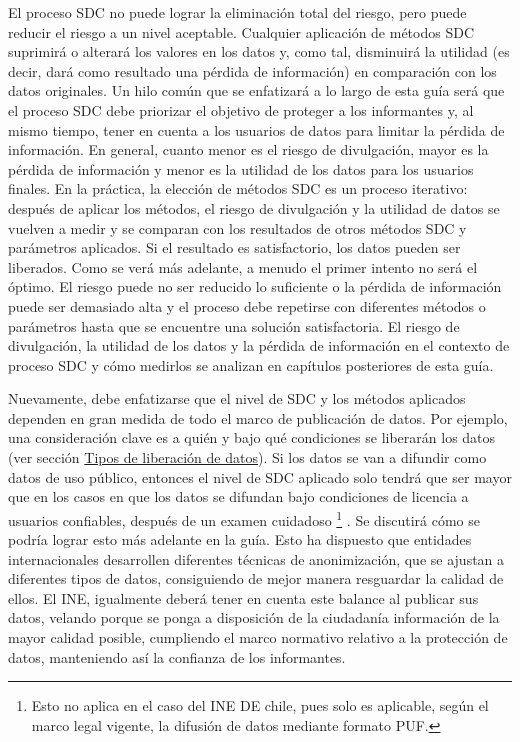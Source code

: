 \documentclass[]{book}
\theoremstyle{definition}
\theoremstyle{definition}
\theoremstyle{definition}
\theoremstyle{definition}
\theoremstyle{remark}
\begin{document}
El proceso SDC no puede lograr la eliminación total del riesgo, pero puede reducir el riesgo a un nivel aceptable. Cualquier aplicación de métodos SDC suprimirá o alterará los valores en los datos y, como tal, disminuirá la utilidad (es decir, dará como resultado una pérdida de información) en comparación con los datos originales. Un hilo común que se enfatizará a lo largo de esta guía será que el proceso SDC debe priorizar el objetivo de proteger a los informantes y, al mismo tiempo, tener en cuenta a los usuarios de datos para limitar la pérdida de información. En general, cuanto menor es el riesgo de divulgación, mayor es la pérdida de información y menor es la utilidad de los datos para los usuarios finales.
En la práctica, la elección de métodos SDC es un proceso iterativo: después de aplicar los métodos, el riesgo de divulgación y la utilidad de datos se vuelven a medir y se comparan con los resultados de otros métodos SDC y parámetros aplicados. Si el resultado es satisfactorio, los datos pueden ser liberados. Como se verá más adelante, a menudo el primer intento no será el óptimo. El riesgo puede no ser reducido lo suficiente o la pérdida de información puede ser demasiado alta y el proceso debe repetirse con diferentes métodos o parámetros hasta que se encuentre una solución satisfactoria. El riesgo de divulgación, la utilidad de los datos y la pérdida de información en el contexto de proceso SDC y cómo medirlos se analizan en capítulos posteriores de esta guía.

Nuevamente, debe enfatizarse que el nivel de SDC y los métodos aplicados dependen en gran medida de todo el marco de publicación de datos. Por ejemplo, una consideración clave es a quién y bajo qué condiciones se liberarán los datos (ver sección \protect\hyperlink{tipos-de-liberaciuxf3n-de-datos}{Tipos de liberación de datos}). Si los datos se van a difundir como datos de uso público, entonces el nivel de SDC aplicado solo tendrá que ser mayor que en los casos en que los datos se difundan bajo condiciones de licencia a usuarios confiables, después de un examen cuidadoso \footnote{Esto no aplica en el caso del INE DE chile, pues solo es aplicable, según el marco legal vigente, la difusión de datos mediante formato PUF.} . Se discutirá cómo se podría lograr esto más adelante en la guía.
Esto ha dispuesto que entidades internacionales desarrollen diferentes técnicas de anonimización, que se ajustan a diferentes tipos de datos, consiguiendo de mejor manera resguardar la calidad de ellos.
El INE, igualmente deberá tener en cuenta este balance al publicar sus datos, velando porque se ponga a disposición de la ciudadanía información de la mayor calidad posible, cumpliendo el marco normativo relativo a la protección de datos, manteniendo así la confianza de los informantes.
\end{document}
